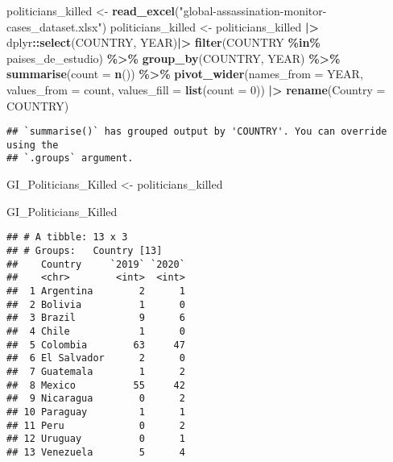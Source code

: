 \documentclass[
  11pt,
]{article}
\newenvironment{Shaded}{\begin{snugshade}}{\end{snugshade}}
\newcommand{\AttributeTok}[1]{\textcolor[rgb]{0.13,0.29,0.53}{#1}}
\newcommand{\DecValTok}[1]{\textcolor[rgb]{0.00,0.00,0.81}{#1}}
\newcommand{\FunctionTok}[1]{\textcolor[rgb]{0.13,0.29,0.53}{\textbf{#1}}}
\newcommand{\NormalTok}[1]{#1}
\newcommand{\OtherTok}[1]{\textcolor[rgb]{0.56,0.35,0.01}{#1}}
\newcommand{\SpecialCharTok}[1]{\textcolor[rgb]{0.81,0.36,0.00}{\textbf{#1}}}
\newcommand{\StringTok}[1]{\textcolor[rgb]{0.31,0.60,0.02}{#1}}
\begin{document}
\begin{Shaded}
\begin{Highlighting}[]
\NormalTok{politicians\_killed }\OtherTok{\textless{}{-}} \FunctionTok{read\_excel}\NormalTok{(}\StringTok{"global{-}assassination{-}monitor{-}cases\_dataset.xlsx"}\NormalTok{) }
\NormalTok{politicians\_killed }\OtherTok{\textless{}{-}}\NormalTok{ politicians\_killed }\SpecialCharTok{|\textgreater{}}
\NormalTok{  dplyr}\SpecialCharTok{::}\FunctionTok{select}\NormalTok{(COUNTRY, YEAR)}\SpecialCharTok{|\textgreater{}}
  \FunctionTok{filter}\NormalTok{(COUNTRY }\SpecialCharTok{\%in\%}\NormalTok{ paises\_de\_estudio) }\SpecialCharTok{\%\textgreater{}\%}
  \FunctionTok{group\_by}\NormalTok{(COUNTRY, YEAR) }\SpecialCharTok{\%\textgreater{}\%}
  \FunctionTok{summarise}\NormalTok{(}\AttributeTok{count =} \FunctionTok{n}\NormalTok{()) }\SpecialCharTok{\%\textgreater{}\%}
  \FunctionTok{pivot\_wider}\NormalTok{(}\AttributeTok{names\_from =}\NormalTok{ YEAR, }\AttributeTok{values\_from =}\NormalTok{ count, }\AttributeTok{values\_fill =} \FunctionTok{list}\NormalTok{(}\AttributeTok{count =} \DecValTok{0}\NormalTok{)) }\SpecialCharTok{|\textgreater{}}
  \FunctionTok{rename}\NormalTok{(}\AttributeTok{Country =}\NormalTok{ COUNTRY)}
\end{Highlighting}
\end{Shaded}

\begin{verbatim}
## `summarise()` has grouped output by 'COUNTRY'. You can override using the
## `.groups` argument.
\end{verbatim}

\begin{Shaded}
\begin{Highlighting}[]
\NormalTok{GI\_Politicians\_Killed }\OtherTok{\textless{}{-}}\NormalTok{ politicians\_killed}

\NormalTok{GI\_Politicians\_Killed}
\end{Highlighting}
\end{Shaded}

\begin{verbatim}
## # A tibble: 13 x 3
## # Groups:   Country [13]
##    Country     `2019` `2020`
##    <chr>        <int>  <int>
##  1 Argentina        2      1
##  2 Bolivia          1      0
##  3 Brazil           9      6
##  4 Chile            1      0
##  5 Colombia        63     47
##  6 El Salvador      2      0
##  7 Guatemala        1      2
##  8 Mexico          55     42
##  9 Nicaragua        0      2
## 10 Paraguay         1      1
## 11 Peru             0      2
## 12 Uruguay          0      1
## 13 Venezuela        5      4
\end{verbatim}
\end{document}
